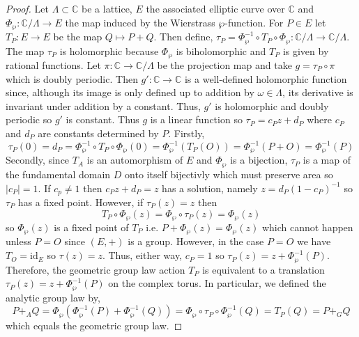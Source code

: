 \documentclass{article}
\newcommand{\C}{\mathbb{C}}
\newcommand{\id}{\mathrm{id}}
\theoremstyle{definition}
\begin{document}
\begin{proof}
Let $\Lambda \subset \C$ be a lattice, $E$ the associated elliptic curve over $\C$ and $\Phi_{\wp} : \C / \Lambda \to E$ the map induced by the Wierstrass $\wp$-function. For $P \in E$ let $T_P : E \to E$ be the map $Q \mapsto P + Q$. Then define, $\tau_P = \Phi_{\wp}^{-1} \circ T_P \circ \Phi_{\wp} : \C / \Lambda \to \C / \Lambda$. The map $\tau_P$ is holomorphic because $\Phi_{\wp}$ is biholomorphic and $T_P$ is given by rational functions. Let $\pi : \C \to \C / \Lambda$ be the projection map and take $g = \tau_P \circ \pi$ which is doubly periodic. Then $g' : \C \to \C$ is a well-defined holomorphic function since, although its image is only defined up to addition by $\omega \in \Lambda$, its derivative is invariant under addition by a constant. Thus, $g'$ is holomorphic and doubly periodic so $g'$ is constant. Thus $g$ is a linear function so $\tau_P = c_P z + d_P$ where $c_P$ and $d_P$ are constants determined by $P$. Firstly, 
\[ \tau_P(0) = d_P =  \Phi_{\wp}^{-1} \circ T_P \circ \Phi_{\wp}(0) = \Phi_{\wp}^{-1}(T_P(O)) = \Phi_{\wp}^{-1}(P + O) = \Phi_{\wp}^{-1}(P) \]
Secondly, since $T_A$ is an automorphism of $E$ and $\Phi_{\wp}$ is a bijection, $\tau_P$ is a map of the fundamental domain $D$ onto itself bijectivly which must preserve area so $|c_P| = 1$. If $c_p \neq 1$ then $c_P z + d_P = z$ has a solution, namely $z = d_P (1 - c_P)^{-1}$ so $\tau_P$ has a fixed point. However, if $\tau_P(z) = z$ then 
\[ T_P \circ \Phi_{\wp}(z) = \Phi_{\wp} \circ \tau_P(z) = \Phi_{\wp}(z) \]
so $\Phi_{\wp}(z)$ is a fixed point of $T_P$ i.e. $P + \Phi_{\wp}(z) = \Phi_{\wp}(z)$ which cannot happen unless $P = O$ since $(E, +)$ is a group. However, in the case $P = O$ we have $T_O = \id_E$ so $\tau(z) = z$. Thus, either way, $c_P = 1$ so $\tau_P(z) = z + \Phi_{\wp}^{-1}(P)$. Therefore, the geometric group law action $T_P$ is equivalent to a translation $\tau_P(z) = z + \Phi_{\wp}^{-1}(P)$ on the complex torus. In particular, we defined the analytic group law by,
\[ P +_A Q = \Phi_{\wp}(\Phi_{\wp}^{-1}(P) + \Phi_{\wp}^{-1}(Q)) = \Phi_{\wp} \circ \tau_P \circ \Phi_{\wp}^{-1}(Q) = T_P(Q) = P +_G Q \]
which equals the geometric group law.
\end{proof}
\end{document}
